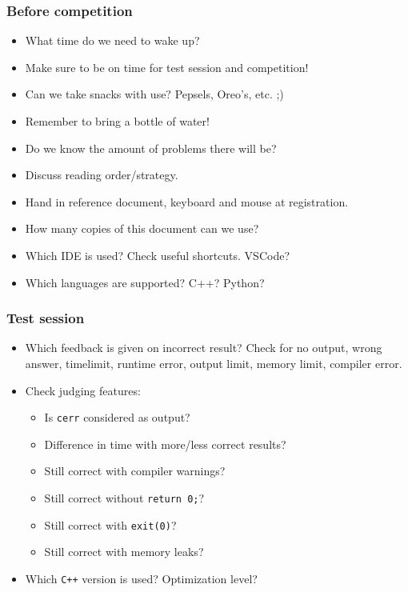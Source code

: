 \subsubsection{Before competition}
\begin{itemize}
    \item What time do we need to wake up?
    \item Make sure to be on time for test session and competition!
    \item Can we take snacks with use? Pepsels, Oreo's, etc. ;)
    \item Remember to bring a bottle of water!
    \item Do we know the amount of problems there will be?
    \item Discuss reading order/strategy.
    \item Hand in reference document, keyboard and mouse at registration.
    \item How many copies of this document can we use?
    \item Which IDE is used? Check useful shortcuts. VSCode?
    \item Which languages are supported? C++? Python?
\end{itemize}

\subsubsection{Test session}
\begin{itemize}
    \item Which feedback is given on incorrect result? Check for \textsf{no output}, \textsf{wrong answer}, \textsf{timelimit}, \textsf{runtime error}, \textsf{output limit}, \textsf{memory limit}, \textsf{compiler error}.
    \item Check judging features:
    \begin{itemize}
        \item Is \texttt{cerr} considered as output?
        \item Difference in time with more/less correct results?
        \item Still correct with compiler warnings?
        \item Still correct without \texttt{return 0;}?
        \item Still correct with \texttt{exit(0)}?
        \item Still correct with memory leaks?
    \end{itemize}
    \item Which \texttt{C++} version is used? Optimization level?
\end{itemize}

